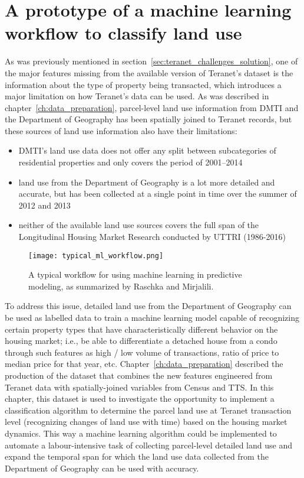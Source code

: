 \chapter{A prototype of a machine learning workflow to classify land use} \label{ch:ml_workflow}

As was previously mentioned in section~\ref{sec:teranet_challenges_solution}, one of the major features missing from the available version of Teranet's dataset is the information about the type of property being transacted, which introduces a major limitation on how Teranet's data can be used.
As was described in chapter~\ref{ch:data_preparation}, parcel-level land use information from DMTI and the Department of Geography has been spatially joined to Teranet records, but these sources of land use information also have their limitations:

\begin{itemize}
    \item DMTI's land use data does not offer any split between subcategories of residential properties and only covers the period of 2001--2014
    \item land use from the Department of Geography is a lot more detailed and accurate, but has been collected at a single point in time over the summer of 2012 and 2013
    \item neither of the available land use sources covers the full span of the Longitudinal Housing Market Research conducted by UTTRI (1986-2016)
\end{itemize}

\begin{figure}[hbt!]
    \centering
    \texttt{[image: typical\_ml\_workflow.png]}
    \caption{A typical workflow for using machine learning in predictive modeling, as summarized by Raschka and Mirjalili\cite{RaschkaMirjalili2017}.}
    \label{fig:typical_ml_workflow}
\end{figure}

To address this issue, detailed land use from the Department of Geography can be used as labelled data to train a machine learning model capable of recognizing certain property types that have characteristically different behavior on the housing market;
i.e., be able to differentiate a detached house from a condo through such features as high / low volume of transactions, ratio of price to median price for that year, etc.
Chapter~\ref{ch:data_preparation} described the production of the dataset that combines the new features engineered from Teranet data with spatially-joined variables from Census and TTS\@.
In this chapter, this dataset is used to investigate the opportunity to implement a classification algorithm to determine the parcel land use at Teranet transaction level (recognizing changes of land use with time) based on the housing market dynamics.
This way a machine learning algorithm could be implemented to automate a labour-intensive task of collecting parcel-level detailed land use and expand the temporal span for which the land use data collected from the Department of Geography can be used with accuracy.

